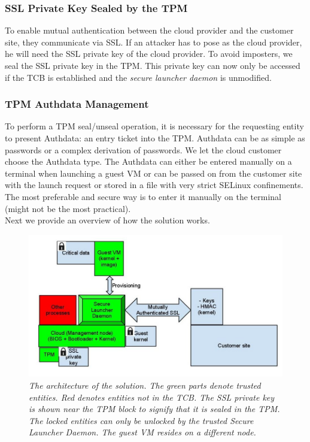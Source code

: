 \documentclass[10pt,twocolumn,pdftex]{article}
\begin{document}
\subsubsection{SSL Private Key Sealed by the TPM}
To enable mutual authentication between the cloud provider and the customer site, they communicate via SSL. If an attacker has to pose as the cloud provider, he will need the SSL private key of the cloud provider. To avoid imposters, we seal the SSL private key in the TPM. This private key can now only be accessed if the TCB is established and the \emph{secure launcher daemon} is unmodified.

\subsubsection{TPM Authdata Management}
To perform a TPM seal/unseal operation, it is necessary for the requesting entity to present Authdata: an entry ticket into the TPM. Authdata can be as simple as passwords or a complex derivation of passwords. We let the cloud customer choose the Authdata type. The Authdata can either be entered manually on a terminal when launching a guest VM or can be passed on from the customer site with the launch request or stored in a file with very strict SELinux confinements. The most preferable and secure way is to enter it manually on the terminal (might not be the most practical). 
\\

Next we provide an overview of how the solution works.

\begin{figure}[htp]
\centering
\includegraphics[scale=0.50]{csc574-solution.jpg}
\caption{\small \sl The architecture of the solution. The green parts denote trusted entities. Red denotes entities not in the TCB. The SSL private key is shown near the TPM block to signify that it is sealed in the TPM. The locked entities can only be unlocked by the trusted Secure Launcher Daemon. The guest VM resides on a different node. }
\label{fig:solution}
\end{figure}
\end{document}
